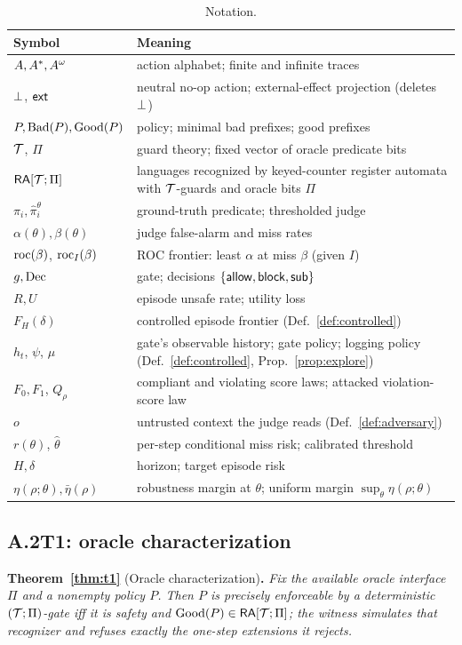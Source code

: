 \begin{table}[t]
\caption{Notation.}
\label{tab:notation}
\centering\footnotesize
\begin{tabularx}{\columnwidth}{@{}>{\raggedright\arraybackslash}p{}>{\raggedright\arraybackslash}X@{}}
\toprule
Symbol & Meaning\\
\midrule
$A,A^{*},A^{\omega}$ & action alphabet; finite and infinite traces\\
$\bot$, $\mathsf{ext}$ & neutral no-op action; external-effect projection (deletes $\bot$)\\
$P,\mathrm{Bad}(P),\mathrm{Good}(P)$ & policy; minimal bad prefixes; good prefixes\\
$\mathcal{T}$, $\Pi$ & guard theory; fixed vector of oracle predicate bits\\
$\mathsf{RA}[\mathcal{T};\Pi]$ & languages recognized by keyed-counter register automata with $\mathcal{T}$-guards and oracle bits $\Pi$\\
$\pi_i,\hat\pi_i^{\theta}$ & ground-truth predicate; thresholded judge\\
$\alpha(\theta),\beta(\theta)$ & judge false-alarm and miss rates\\
$\mathrm{roc}(\beta)$, $\mathrm{roc}_I(\beta)$ & ROC frontier: least $\alpha$ at miss $\beta$ (given $I$)\\
$g,\mathrm{Dec}$ & gate; decisions $\{\mathsf{allow},\mathsf{block},\mathsf{sub}\}$\\
$R,U$ & episode unsafe rate; utility loss\\
$F_H(\delta)$ & controlled episode frontier (Def.~\ref{def:controlled})\\
$h_t$, $\psi$, $\mu$ & gate's observable history; gate policy; logging policy (Def.~\ref{def:controlled}, Prop.~\ref{prop:explore})\\
$F_0,F_1$, $Q_\rho$ & compliant and violating score laws; attacked violation-score law\\
$o$ & untrusted context the judge reads (Def.~\ref{def:adversary})\\
$r(\theta)$, $\hat\theta$ & per-step conditional miss risk; calibrated threshold\\
$H,\delta$ & horizon; target episode risk\\
$\eta(\rho;\theta),\bar\eta(\rho)$ & robustness margin at $\theta$; uniform margin $\sup_\theta\eta(\rho;\theta)$\\
\bottomrule
\end{tabularx}
\end{table}

\subsection*{A.2\quad T1: oracle characterization}
\noindent\textbf{Theorem~\ref{thm:t1}} (Oracle characterization)\textbf{.}
\emph{Fix the available oracle interface $\Pi$ and a nonempty policy $P$. Then $P$ is precisely
enforceable by a deterministic $(\mathcal{T};\Pi)$-gate iff it is safety and
$\mathrm{Good}(P)\in\mathsf{RA}[\mathcal{T};\Pi]$; the witness simulates that recognizer and refuses
exactly the one-step extensions it rejects.}

